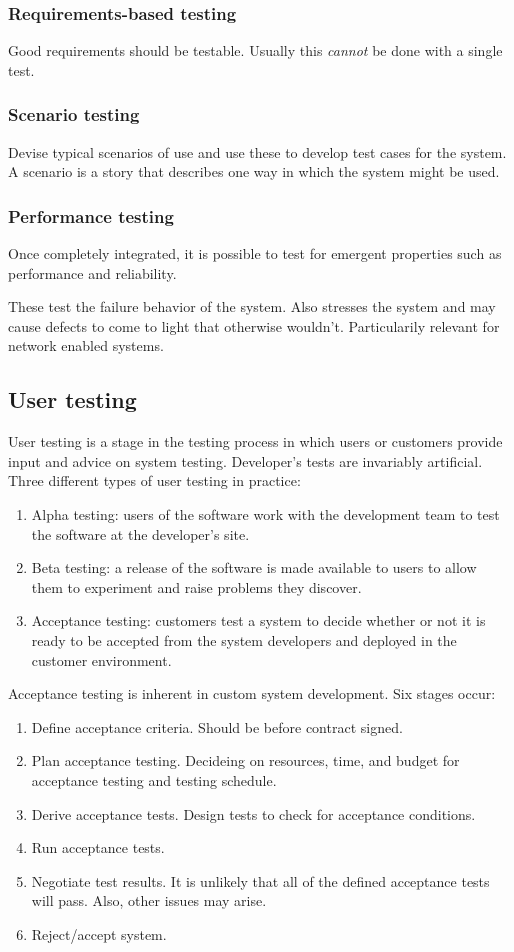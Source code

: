 \documentclass{article}
\begin{document}
\subsubsection{Requirements-based testing}
Good requirements should be testable.  Usually this \textit{cannot} be done with a single test.

\subsubsection{Scenario testing}
Devise typical scenarios of use and use these to develop test cases for the system.  A scenario is a story that describes one way in which the system might be used.

\subsubsection{Performance testing}
Once completely integrated, it is possible to test for emergent properties such as performance and reliability.

These test the failure behavior of the system.  Also stresses the system and may cause defects to come to light that otherwise wouldn't.
Particularily relevant for network enabled systems.

\subsection{User testing}
User testing is a stage in the testing process in which users or customers provide input and advice on system testing.
Developer's tests are invariably artificial.  Three different types of user testing in practice:
\begin{enumerate}
    \item Alpha testing: users of the software work with the development team to test the software at the developer's site.
    \item Beta testing: a release of the software is made available to users to allow them to experiment and raise problems they discover.
    \item Acceptance testing: customers test a system to decide whether or not it is ready to be accepted from the system developers and deployed in the customer environment.
\end{enumerate}

Acceptance testing is inherent in custom system development.  Six stages occur:
\begin{enumerate}
    \item Define acceptance criteria. Should be before contract signed.
    \item Plan acceptance testing.  Decideing on resources, time, and budget for acceptance testing and testing schedule.
    \item Derive acceptance tests.  Design tests to check for acceptance conditions.
    \item Run acceptance tests.
    \item Negotiate test results.  It is unlikely that all of the defined acceptance tests will pass.  Also, other issues may arise.
    \item Reject/accept system.  
\end{enumerate}
\end{document}
